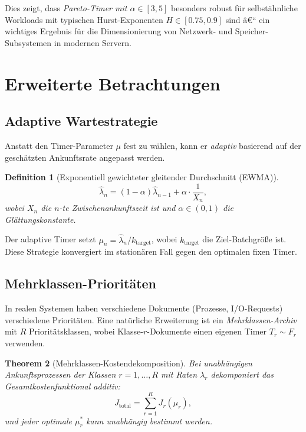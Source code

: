 ﻿\documentclass[12pt, a4paper]{article}
\newtheorem{theorem}{Theorem}[section]
\newtheorem{definition}[theorem]{Definition}
\begin{document}
Dies zeigt, dass \emph{Pareto-Timer mit $\alpha \in [3, 5]$} besonders robust für
selbstähnliche Workloads mit typischen Hurst-Exponenten $H \in [0.75, 0.9]$ sind â€“
ein wichtiges Ergebnis für die Dimensionierung von Netzwerk- und
Speicher-Subsystemen in modernen Servern.

\section{Erweiterte Betrachtungen}\label{sec:extensions}

\subsection{Adaptive Wartestrategie}

Anstatt den Timer-Parameter $\mu$ fest zu wählen, kann er \emph{adaptiv}
basierend auf der geschätzten Ankunftsrate angepasst werden.

\begin{definition}[Exponentiell gewichteter gleitender Durchschnitt (EWMA)]
\[
  \hat\lambda_n = (1-\alpha)\hat\lambda_{n-1} + \alpha \cdot \frac{1}{X_n},
\]
wobei $X_n$ die $n$-te Zwischenankunftszeit ist und $\alpha \in (0,1)$ die
Glättungskonstante.
\end{definition}

Der adaptive Timer setzt $\mu_n = \hat\lambda_n / k_{\mathrm{target}}$, wobei
$k_{\mathrm{target}}$ die Ziel-Batchgröße ist. Diese Strategie konvergiert
im stationären Fall gegen den optimalen fixen Timer.

\subsection{Mehrklassen-Prioritäten}

In realen Systemen haben verschiedene Dokumente (Prozesse, I/O-Requests)
verschiedene Prioritäten. Eine natürliche Erweiterung ist ein
\emph{Mehrklassen-Archiv} mit $R$ Prioritätsklassen, wobei Klasse-$r$-Dokumente
einen eigenen Timer $T_r \sim F_r$ verwenden.

\begin{theorem}[Mehrklassen-Kostendekomposition]
Bei unabhängigen Ankunftsprozessen der Klassen $r = 1,\ldots,R$ mit Raten
$\lambda_r$ dekomponiert das Gesamtkostenfunktional additiv:
\[
  J_{\mathrm{total}} = \sum_{r=1}^R J_r(\mu_r),
\]
und jeder optimale $\mu_r^*$ kann unabhängig bestimmt werden.
\end{theorem}
\end{document}
